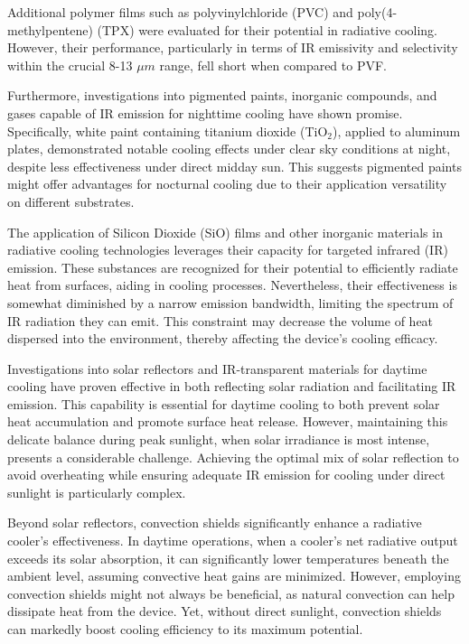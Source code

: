 Additional polymer films such as polyvinylchloride (PVC) and poly(4-methylpentene) (TPX) were evaluated for their potential in radiative cooling. However, their performance, particularly in terms of IR emissivity and selectivity within the crucial 8-13 $\mu m$ range, fell short when compared to PVF.

Furthermore, investigations into pigmented paints, inorganic compounds, and gases capable of IR emission for nighttime cooling have shown promise. Specifically, white paint containing titanium dioxide (TiO$_2$), applied to aluminum plates, demonstrated notable cooling effects under clear sky conditions at night, despite less effectiveness under direct midday sun. This suggests pigmented paints might offer advantages for nocturnal cooling due to their application versatility on different substrates.

The application of Silicon Dioxide (SiO) films and other inorganic materials in radiative cooling technologies leverages their capacity for targeted infrared (IR) emission. These substances are recognized for their potential to efficiently radiate heat from surfaces, aiding in cooling processes. Nevertheless, their effectiveness is somewhat diminished by a narrow emission bandwidth, limiting the spectrum of IR radiation they can emit. This constraint may decrease the volume of heat dispersed into the environment, thereby affecting the device's cooling efficacy.

Investigations into solar reflectors and IR-transparent materials for daytime cooling have proven effective in both reflecting solar radiation and facilitating IR emission. This capability is essential for daytime cooling to both prevent solar heat accumulation and promote surface heat release. However, maintaining this delicate balance during peak sunlight, when solar irradiance is most intense, presents a considerable challenge. Achieving the optimal mix of solar reflection to avoid overheating while ensuring adequate IR emission for cooling under direct sunlight is particularly complex.

Beyond solar reflectors, convection shields significantly enhance a radiative cooler's effectiveness. In daytime operations, when a cooler's net radiative output exceeds its solar absorption, it can significantly lower temperatures beneath the ambient level, assuming convective heat gains are minimized. However, employing convection shields might not always be beneficial, as natural convection can help dissipate heat from the device. Yet, without direct sunlight, convection shields can markedly boost cooling efficiency to its maximum potential.

